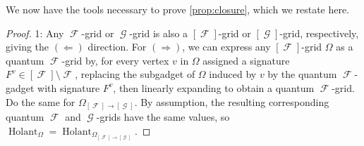 \documentclass{article}
\DeclareMathOperator{\fc}{\mathcal{F}}
\DeclareMathOperator{\gc}{\mathcal{G}}
\DeclareMathOperator{\holant}{Holant}
\begin{document}
We now have the tools necessary to prove \autoref{prop:closure}, which we restate here.
\closurelemma*
\begin{proof}
    1: Any $\fc$-grid or $\gc$-grid is also a $[\fc]$-grid or $[\gc]$-grid, respectively, giving
    the $(\Longleftarrow)$ direction. 
    For $(\Longrightarrow)$, we can express any $[\fc]$-grid $\Omega$
    as a quantum $\fc$-grid by, for every vertex $v$ in $\Omega$ assigned a signature $F^v \in
    [\fc] \setminus \fc$, replacing the subgadget of $\Omega$ induced by $v$ by the quantum
    $\fc$-gadget with signature $F^v$, then linearly expanding to obtain a quantum $\fc$-grid.
    Do the same for $\Omega_{[\fc]\to[\gc]}$. 
    By assumption, the resulting corresponding quantum $\fc$ 
    and $\gc$-grids have the same values, so $\holant_\Omega = \holant_{\Omega_{[\fc]\to[\gc]}}$.


\end{proof}
\end{document}
